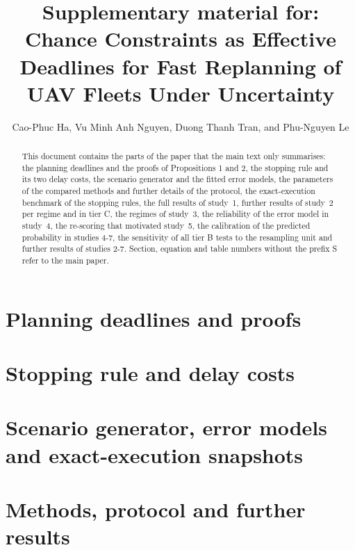 \documentclass[a4paper,10pt]{article}
\newcommand{\uprighttext}{\def\textbf##1{##1}\def\textit##1{##1}}
\newcommand{\inputtable}[1]{\begingroup\uprighttext\endgroup}
\begin{document}
\title{Supplementary material for: Chance Constraints as Effective Deadlines for Fast Replanning of UAV Fleets Under Uncertainty}
\author{Cao-Phuc Ha, Vu Minh Anh Nguyen, Duong Thanh Tran, and Phu-Nguyen Le}
\date{}
\maketitle

\begin{abstract}
This document contains the parts of the paper that the main text only summarises: the planning deadlines and the proofs
of Propositions 1 and 2, the stopping rule and its two delay costs, the scenario generator and the fitted error models,
the parameters of the compared methods and further details of the protocol, the exact-execution benchmark of the
stopping rules, the full results of study~1, further results of study~2 per regime and in tier C, the regimes of
study~3, the reliability of the error model in study~4, the re-scoring that motivated study~5, the calibration of the
predicted probability in studies 4-7, the sensitivity of all tier B tests to the resampling unit and further results
of studies 2-7. Section, equation and table numbers without the prefix S refer to the main paper.
\end{abstract}

\section{Planning deadlines and proofs}\label{sec:Sproofs}


\section{Stopping rule and delay costs}\label{sec:Sstop}


\section{Scenario generator, error models and exact-execution snapshots}\label{sec:Sscen}


\inputtable{tabm_errmodels}

\section{Methods, protocol and further results}\label{sec:Sdetails}

\end{document}
